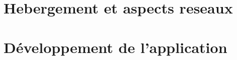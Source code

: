 \documentclass[12pt, a4paper, oneside]{article}
\begin{document}
    \section{Hebergement et aspects reseaux}\label{sec:hebergement-et-aspects-reseaux}
    


    \section{Développement de l'application}\label{sec:developpement-de-l'application}

%
%
%
%
%
%
%
%





    \newpage
\end{document}
